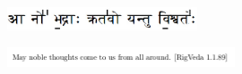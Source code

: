 \begin{figure}
	\vfill
	\begin{center}
		\includegraphics[width=0.5\textwidth]{figures/AaNoBhadrA.jpg}
	\end{center}
	\vfill
	\label{fig:AaNoBhadrA}
\end{figure}

\begin{figure}
	\begin{center}
		\includegraphics[width=0.6\textwidth]{figures/AaNoBhadrAE.png}
	\end{center}
	\label{fig:AaNoBhadrAE}
\end{figure}

